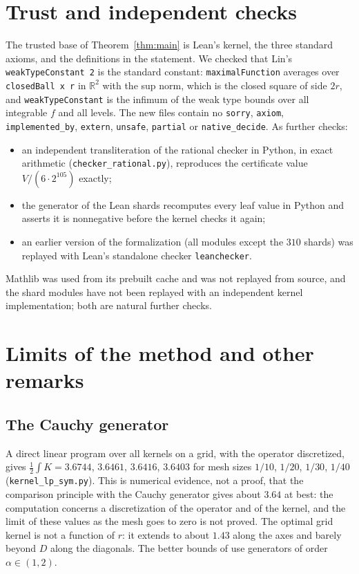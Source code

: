 \documentclass[11pt]{amsart}
\theoremstyle{definition}
\theoremstyle{remark}
\newcommand{\R}{\mathbb{R}}
\newcommand{\lean}[1]{\texttt{#1}}
\begin{document}
\section{Trust and independent checks}

The trusted base of Theorem~\ref{thm:main} is Lean's kernel, the three standard axioms, and the
definitions in the statement. We checked that Lin's \lean{weakTypeConstant 2} is the standard
constant: \lean{maximalFunction} averages over \lean{closedBall x r} in $\R^2$ with the sup norm,
which is the closed square of side $2r$, and \lean{weakTypeConstant} is the infimum of the weak type
bounds over all integrable $f$ and all levels. The new files contain no \lean{sorry}, \lean{axiom},
\lean{implemented\_by}, \lean{extern}, \lean{unsafe}, \lean{partial} or \lean{native\_decide}.
As further checks:
\begin{itemize}[leftmargin=2em]
\item an independent transliteration of the rational checker in Python, in exact arithmetic
  (\texttt{checker\_rational.py}), reproduces the certificate value $V/(6\cdot2^{105})$ exactly;
\item the generator of the Lean shards recomputes every leaf value in Python and asserts it is
  nonnegative before the kernel checks it again;
\item an earlier version of the formalization (all modules except the $310$ shards) was replayed
  with Lean's standalone checker \lean{leanchecker}.
\end{itemize}
Mathlib was used from its prebuilt cache and was not replayed from source, and the shard modules have
not been replayed with an independent kernel implementation; both are natural further checks.

\section{Limits of the method and other remarks}\label{sec:limits}

\subsection*{The Cauchy generator}
A direct linear program over all kernels on a grid, with the operator discretized, gives
$\frac12\int K = 3.6744$, $3.6461$, $3.6416$, $3.6403$ for mesh sizes $1/10$, $1/20$, $1/30$, $1/40$
(\texttt{kernel\_lp\_sym.py}). This is numerical evidence, not a proof, that the comparison principle
with the Cauchy generator gives about $3.64$ at best: the computation concerns a discretization of the
operator and of the kernel, and the limit of these values as the mesh goes to zero is not proved. The optimal grid kernel is not a function of $r$: it extends to
about $1.43$ along the axes and barely beyond $D$ along the diagonals. The better bounds of
\cite{LinArticle,Tomar} use generators of order $\alpha \in (1,2)$.
\end{document}
